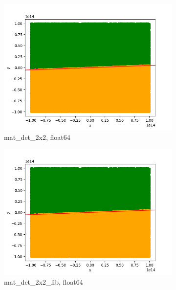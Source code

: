 \documentclass[11pt,a4paper]{article}
\begin{document}
\begin{figure}[H]
    \centering
    \begin{subfigure}[b]{0.46\textwidth}
        \centering
        \includegraphics[scale=0.49]{res/rec2_mat_det_2x2_float64_0.png}
        \caption{\ttfamily\arraybackslash mat\_det\_2x2, float64}
    \end{subfigure}
    \begin{subfigure}[b]{0.46\textwidth}
        \centering
        \includegraphics[scale=0.49]{res/rec2_mat_det_2x2_lib_float64_0.png}
        \caption{\ttfamily\arraybackslash mat\_det\_2x2\_lib, float64}
    \end{subfigure}
    \begin{subfigure}[b]{0.46\textwidth}

\end{subfigure}
\end{figure}
\end{document}
